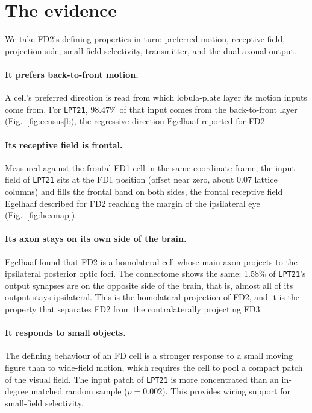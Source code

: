 \documentclass[11pt]{article}
\newcommand{\ttt}[1]{\texttt{#1}}
\begin{document}
\section{The evidence}

We take FD2's defining properties in turn: preferred motion, receptive field, projection side, small-field selectivity, transmitter, and the dual axonal output.

\paragraph{It prefers back-to-front motion.} A cell's preferred direction is read from which lobula-plate layer its motion inputs come from. For \ttt{LPT21}, 98.47\% of that input comes from the back-to-front layer (Fig.~\ref{fig:census}b), the regressive direction Egelhaaf reported for FD2.

\paragraph{Its receptive field is frontal.} Measured against the frontal FD1 cell in the same coordinate frame, the input field of \ttt{LPT21} sits at the FD1 position (offset near zero, about 0.07 lattice columns) and fills the frontal band on both sides, the frontal receptive field Egelhaaf described for FD2 reaching the margin of the ipsilateral eye (Fig.~\ref{fig:hexmap}).

\paragraph{Its axon stays on its own side of the brain.} Egelhaaf found that FD2 is a homolateral cell whose main axon projects to the ipsilateral posterior optic foci. The connectome shows the same: 1.58\% of \ttt{LPT21}'s output synapses are on the opposite side of the brain, that is, almost all of its output stays ipsilateral. This is the homolateral projection of FD2, and it is the property that separates FD2 from the contralaterally projecting FD3.

\paragraph{It responds to small objects.} The defining behaviour of an FD cell is a stronger response to a small moving figure than to wide-field motion, which requires the cell to pool a compact patch of the visual field. The input patch of \ttt{LPT21} is more concentrated than an in-degree matched random sample ($p=0.002$). This provides wiring support for small-field selectivity.
\end{document}
